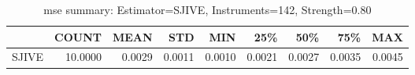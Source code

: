 \begin{table}[ht]
\centering
\caption{mse summary: Estimator=SJIVE, Instruments=142, Strength=0.80}
\begin{tabular}{lrrrrrrrr}
\toprule
 & COUNT & MEAN & STD & MIN & 25\% & 50\% & 75\% & MAX \\
\midrule
SJIVE & 10.0000 & 0.0029 & 0.0011 & 0.0010 & 0.0021 & 0.0027 & 0.0035 & 0.0045 \\
\bottomrule
\end{tabular}
\end{table}
